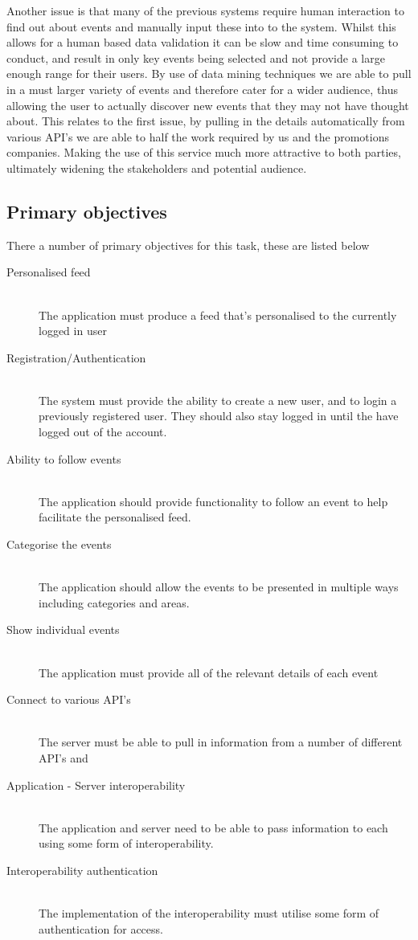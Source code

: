 	Another issue is that many of the previous systems require human interaction to find out about events and manually input these into to the system. Whilst this allows for a human based data validation it can be slow and time consuming to conduct, and result in only key events being selected and not provide a large enough range for their users. By use of data mining techniques we are able to pull in a must larger variety of events and therefore cater for a wider audience, thus allowing the user to actually discover new events that they may not have thought about. This relates to the first issue, by pulling in the details automatically from various API's we are able to half the work required by us and the promotions companies. Making the use of this service much more attractive to both parties, ultimately widening the stakeholders and potential audience. 		

	\subsection{Primary objectives}
		
		There a number of primary objectives for this task, these are listed below

		\begin{description}
			\item[Personalised feed] \hfill \\
				The application must produce a feed that's personalised to the currently logged in user
			\item[Registration/Authentication] \hfill \\
				The system must provide the ability to create a new user, and to login a previously registered user. They should also stay logged in until the have logged out of the account.
			\item[Ability to follow events] \hfill \\
				The application should provide functionality to follow an event to help facilitate the personalised feed. 
			\item[Categorise the events] \hfill \\
				The application should allow the events to be presented in multiple ways including categories and areas. 
			\item[Show individual events] \hfill \\
				The application must provide all of the relevant details of each event
			\item[Connect to various API's] \hfill \\
				The server must be able to pull in information from a number of different API's and 
			\item[Application - Server interoperability] \hfill \\
				The application and server need to be able to pass information to each using some form of interoperability. 
			\item[Interoperability authentication] \hfill \\
				The implementation of the interoperability must utilise some form of authentication for access. 
		\end{description}

